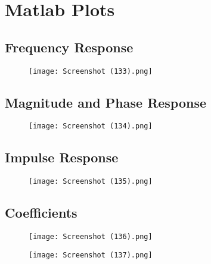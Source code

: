 \documentclass{article}
\begin{document}
\section{Matlab Plots}
\subsection{Frequency Response}
\begin{figure}[H]
\hspace*{-2.5cm}
    \centering
    \texttt{[image: Screenshot (133).png]}
    \label{fig:my_label}
\end{figure}

\subsection{Magnitude and Phase Response}
\begin{figure}[H]
\hspace*{-2.5cm}
    \centering
    \texttt{[image: Screenshot (134).png]}
    \label{fig:my_label}
\end{figure}

\subsection{Impulse Response}
\begin{figure}[H]
\hspace*{-2.5cm}
    \centering
    \texttt{[image: Screenshot (135).png]}
    \label{fig:my_label}
\end{figure}

\subsection{Coefficients}
\begin{figure}[H]
\hspace*{-2.5cm}
    \centering
    \texttt{[image: Screenshot (136).png]}
    \label{fig:my_label}
\end{figure}

\begin{figure}[H]
\hspace*{-2.5cm}
    \centering
    \texttt{[image: Screenshot (137).png]}
    \label{fig:my_label}
\end{figure}
\end{document}
